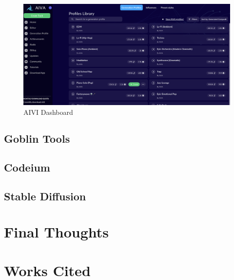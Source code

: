 \documentclass[
]{book}
\begin{document}
\begin{figure}

{\centering \includegraphics[width=0.95\linewidth]{AIVI_Dashboard} 

}

\caption{AIVI Dashboard}\label{fig:unnamed-chunk-12}
\end{figure}

\hypertarget{goblin-tools}{%
\section{Goblin Tools}\label{goblin-tools}}

\hypertarget{codeium}{%
\section{Codeium}\label{codeium}}

\hypertarget{stable-diffusion}{%
\section{Stable Diffusion}\label{stable-diffusion}}

\hypertarget{final-thoughts}{%
\chapter{Final Thoughts}\label{final-thoughts}}

\hypertarget{works-cited}{%
\chapter{Works Cited}\label{works-cited}}
\end{document}
